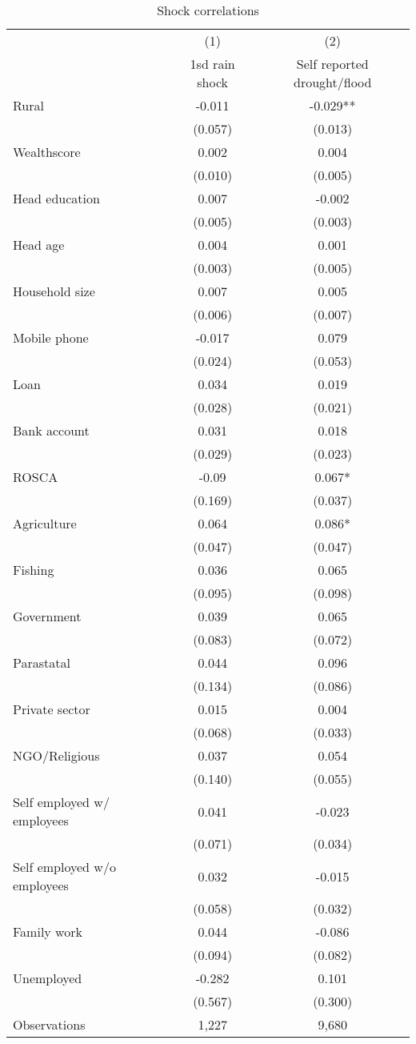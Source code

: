 \begin{table}
\centering \caption{Shock correlations} \label{shock corr}
\def\arraystretch{0.7}
\begin{tabular}{lcc} \hline
 & (1) & (2) \\
 & 1sd rain shock & Self reported drought/flood \\ \hline
Rural & -0.011 & -0.029** \\
 & (0.057) & (0.013) \\
Wealthscore & 0.002 & 0.004 \\
 & (0.010) & (0.005) \\
Head education & 0.007 & -0.002 \\
 & (0.005) & (0.003) \\
Head age & 0.004 & 0.001 \\
 & (0.003) & (0.005) \\
Household size & 0.007 & 0.005 \\
 & (0.006) & (0.007) \\
Mobile phone & -0.017 & 0.079 \\
 & (0.024) & (0.053) \\
Loan  & 0.034 & 0.019 \\
 & (0.028) & (0.021) \\
Bank account & 0.031 & 0.018 \\
 & (0.029) & (0.023) \\
ROSCA  & -0.09 & 0.067* \\
 & (0.169) & (0.037) \\
Agriculture & 0.064 & 0.086* \\
 & (0.047) & (0.047) \\
Fishing & 0.036 & 0.065 \\
 & (0.095) & (0.098) \\
Government & 0.039 & 0.065 \\
 & (0.083) & (0.072) \\
Parastatal & 0.044 & 0.096 \\
 & (0.134) & (0.086) \\
Private sector & 0.015 & 0.004 \\
 & (0.068) & (0.033) \\
NGO/Religious & 0.037 & 0.054 \\
 & (0.140) & (0.055) \\
Self employed w/ employees & 0.041 & -0.023 \\
 & (0.071) & (0.034) \\
Self employed w/o employees & 0.032 & -0.015 \\
 & (0.058) & (0.032) \\
Family work& 0.044 & -0.086 \\
 & (0.094) & (0.082) \\
Unemployed & -0.282 & 0.101 \\
 & (0.567) & (0.300) \\
Observations & 1,227 & 9,680 \\


\end{tabular}
\end{table}

